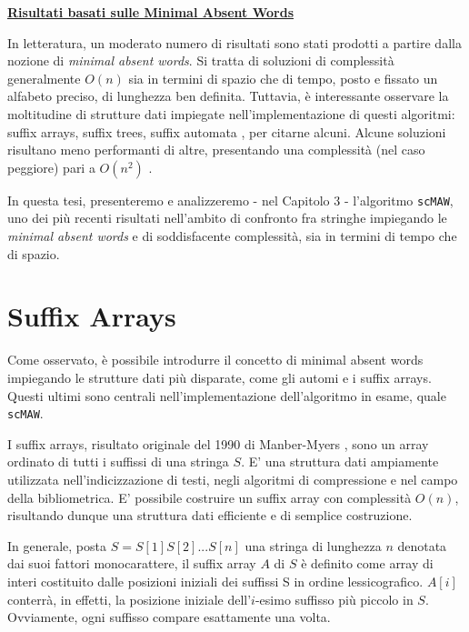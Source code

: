 \vspace{10mm}

\underline{\textbf{Risultati basati sulle Minimal Absent Words}}

\vspace{5mm}

In letteratura, un moderato numero di risultati sono stati prodotti a partire dalla nozione di \textit{minimal absent words}. Si tratta di soluzioni di complessità generalmente $O(n)$ sia in termini di spazio che di tempo, posto e fissato un alfabeto preciso, di lunghezza ben definita. Tuttavia, è interessante osservare la moltitudine di strutture dati impiegate nell'implementazione di questi algoritmi: suffix arrays, suffix trees, suffix automata \cite{maw1}, per citarne alcuni. Alcune soluzioni risultano meno performanti di altre, presentando una complessità (nel caso peggiore) pari a $O(n^2 )$ \cite{findingMaw}.

\vspace{3mm}

In questa tesi, presenteremo e analizzeremo - nel Capitolo 3 - l'algoritmo \verb|scMAW|, uno dei più recenti risultati nell'ambito di confronto fra stringhe impiegando le \textit{minimal absent words} e di soddisfacente complessità, sia in termini di tempo che di spazio.

\section{Suffix Arrays}

Come osservato, è possibile introdurre il concetto di minimal absent words impiegando le strutture dati più disparate, come gli automi e i suffix arrays. Questi ultimi sono centrali nell'implementazione dell'algoritmo in esame, quale \verb|scMAW|.

\vspace{3mm}

I suffix arrays, risultato originale del 1990 di Manber-Myers \cite{suffixArray}, sono un array ordinato di tutti i suffissi di una stringa $S$. E' una struttura dati ampiamente utilizzata nell'indicizzazione di testi, negli algoritmi di compressione e nel campo della bibliometrica. E' possibile costruire un suffix array con complessità $O(n)$, risultando dunque una struttura dati efficiente e di semplice costruzione.

\vspace{3mm}

In generale, posta $S=S[1]S[2]...S[n]$ una stringa di lunghezza $n$ denotata dai suoi fattori monocarattere, il suffix array $A$ di $S$ è definito come array di interi costituito dalle posizioni iniziali dei suffissi S in ordine lessicografico. $A[i]$ conterrà, in effetti, la posizione iniziale dell'$i$-esimo suffisso più piccolo in $S$. Ovviamente, ogni suffisso compare esattamente una volta. 


